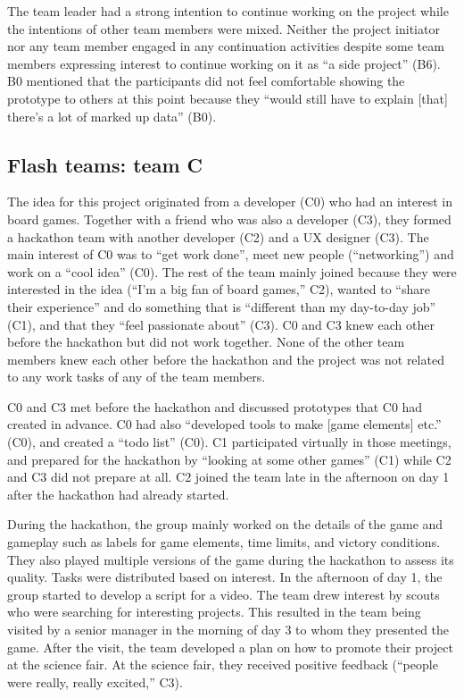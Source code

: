 \documentclass{hcij}
\begin{document}
The team leader had a strong intention to continue working on the project while the intentions of other team members were mixed. Neither the project initiator nor any team member engaged in any continuation activities despite some team members expressing interest to continue working on it as “a side project” (B6). B0 mentioned that the participants did not feel comfortable showing the prototype to others at this point because they “would still have to explain [that] there's a lot of marked up data” (B0).

\subsection{Flash teams: team C}
The idea for this project originated from a developer (C0) who had an interest in board games. Together with a friend who was also a developer (C3), they formed a hackathon team with another developer (C2) and a UX designer (C3). The main interest of C0 was to “get work done”, meet new people (“networking”) and work on a “cool idea” (C0). The rest of the team mainly joined because they were interested in the idea (“I’m a big fan of board games,” C2), wanted to “share their experience” and do something that is “different than my day-to-day job” (C1), and that they “feel passionate about” (C3). C0 and C3 knew each other before the hackathon but did not work together. None of the other team members knew each other before the hackathon and the project was not related to any work tasks of any of the team members.

C0 and C3 met before the hackathon and discussed prototypes that C0 had created in advance. C0 had also “developed tools to make [game elements] etc.” (C0), and created a “todo list” (C0). C1 participated virtually in those meetings, and prepared for the hackathon by “looking at some other games” (C1) while C2 and C3 did not prepare at all. C2 joined the team late in the afternoon on day 1 after the hackathon had already started.

During the hackathon, the group mainly worked on the details of the game and gameplay such as labels for game elements, time limits, and victory conditions. They also played multiple versions of the game during the hackathon to assess its quality. Tasks were distributed based on interest. In the afternoon of day 1, the group started to develop a script for a video. The team drew interest by scouts who were searching for interesting projects. This resulted in the team being visited by a senior manager in the morning of day 3 to whom they presented the game. After the visit, the team developed a plan on how to promote their project at the science fair. At the science fair, they received positive feedback (“people were really, really excited,” C3).
\end{document}
